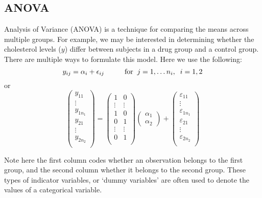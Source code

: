 \subsection{ANOVA}
Analysis of Variance (ANOVA) is a technique for comparing the means across multiple groups.
For example, we may be interested in determining whether the cholesterol levels ($y$) differ between subjects in a drug group and a control group.
There are multiple ways to formulate this model. Here we use the following:
$$
y_{ij} =  \alpha_i +  \epsilon_{ij}  \hskip1cm {\mbox{for}}  \;\; j=1,\ldots n_i, \; \;  i = 1,2
$$
or
$$
\left( \begin{array}{c}
y_{11} \\ \vdots \\ y_{1n_1} \\
y_{21} \\ \vdots \\ y_{2n_2} \\
\end{array} \right) =
\left( \begin{array}{ccc}
 1   &   0  \\ 
 \vdots &\vdots\\ 
1   &   0  \\
 0   &   1  \\ 
\vdots &\vdots\\ 
 0   &   1  \\ 
\end{array} \right)
\left( \begin{array}{c} \alpha_1 \\ \alpha_2 \end{array} \right) +
\left( \begin{array}{c}
\varepsilon_{11} \\ \vdots \\ \varepsilon_{1n_1} \\
\varepsilon_{21} \\ \vdots \\ \varepsilon_{2n_2} \\
\end{array} \right) 
$$

Note here the first column codes whether an observation belongs to the first group, and the second column whether it belongs to the second group.
These types of indicator variables, or `dummy variables' are often used to denote the values of a categorical variable.

